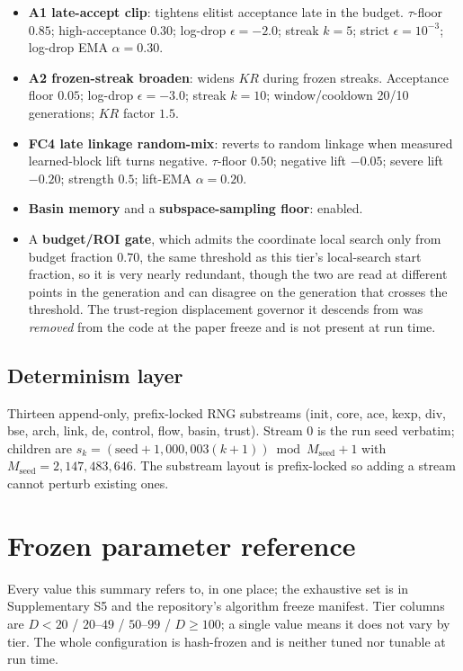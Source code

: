 \documentclass[11pt,a4paper]{article}
\begin{document}
\begin{itemize}[leftmargin=1.2em, itemsep=1pt, topsep=3pt]
\item \textbf{A1 late-accept clip}: tightens elitist acceptance late in the
      budget. $\tau$-floor $0.85$; high-acceptance $0.30$; log-drop
      $\epsilon = -2.0$; streak $k = 5$; strict $\epsilon = 10^{-3}$; log-drop
      EMA $\alpha = 0.30$.
\item \textbf{A2 frozen-streak broaden}: widens $KR$ during frozen streaks.
      Acceptance floor $0.05$; log-drop $\epsilon = -3.0$; streak $k = 10$;
      window/cooldown 20/10 generations; $KR$ factor $1.5$.
\item \textbf{FC4 late linkage random-mix}: reverts to random linkage when
      measured learned-block lift turns negative. $\tau$-floor $0.50$;
      negative lift $-0.05$; severe lift $-0.20$; strength $0.5$; lift-EMA
      $\alpha = 0.20$.
\item \textbf{Basin memory} and a \textbf{subspace-sampling floor}: enabled.
\item A \textbf{budget/ROI gate}, which admits the coordinate local search
      only from budget fraction $0.70$, the same threshold as this tier's
      local-search start fraction, so it is very nearly redundant, though the
      two are read at different points in the generation and can disagree on
      the generation that crosses the threshold. The trust-region displacement
      governor it descends from was \emph{removed} from the code at the paper
      freeze and is not present at run time.
\end{itemize}

\subsection{Determinism layer}

Thirteen append-only, prefix-locked RNG substreams (init, core, ace, kexp, div,
bse, arch, link, de, control, flow, basin, trust). Stream 0 is the run seed
verbatim; children are $s_k = (\text{seed} + 1{,}000{,}003(k{+}1)) \bmod
M_{\mathrm{seed}} + 1$ with $M_{\mathrm{seed}} = 2{,}147{,}483{,}646$. The
substream layout is prefix-locked so adding a stream cannot perturb existing
ones.

\section{Frozen parameter reference}

Every value this summary refers to, in one place; the exhaustive set is in
Supplementary S5 and the repository's algorithm freeze manifest. Tier columns
are $D{<}20$ / $20$--$49$ / $50$--$99$ / $D{\geq}100$; a single value means it
does not vary by tier. The whole configuration is hash-frozen and is neither
tuned nor tunable at run time.
\end{document}
